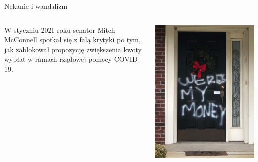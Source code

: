 \begin{frame}{Nękanie i wandalizm}
\begin{columns}[c]
    \begin{block}{}
      W styczniu 2021 roku senator Mitch McConnell spotkał się z falą krytyki po tym, jak zablokował propozycję zwiększenia kwoty wypłat w ramach rządowej pomocy COVID-19.
    \end{block}
    \includegraphics[width=1\textwidth]{images/vandalism.jpg}
\end{columns}
\end{frame}

